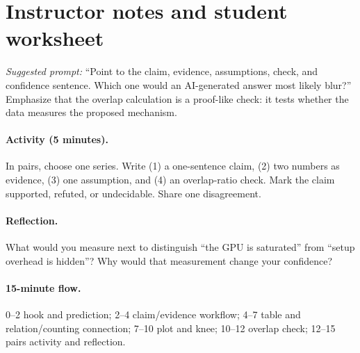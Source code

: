 \documentclass{article}
\begin{document}
\section{Instructor notes and student worksheet}
\textit{Suggested prompt:} “Point to the claim, evidence, assumptions, check, and confidence sentence. Which one would an AI-generated answer most likely blur?” Emphasize that the overlap calculation is a proof-like check: it tests whether the data measures the proposed mechanism.

\paragraph{Activity (5 minutes).} In pairs, choose one series. Write (1) a one-sentence claim, (2) two numbers as evidence, (3) one assumption, and (4) an overlap-ratio check. Mark the claim supported, refuted, or undecidable. Share one disagreement.

\paragraph{Reflection.} What would you measure next to distinguish “the GPU is saturated” from “setup overhead is hidden”? Why would that measurement change your confidence?

\paragraph{15-minute flow.} 0--2 hook and prediction; 2--4 claim/evidence workflow; 4--7 table and relation/counting connection; 7--10 plot and knee; 10--12 overlap check; 12--15 pairs activity and reflection.
\end{document}
